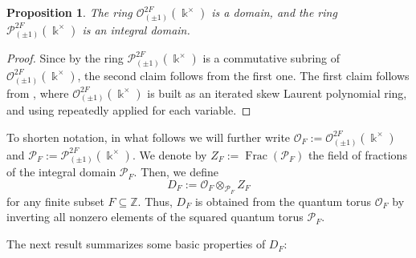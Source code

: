 \documentclass{amsart}
\newtheorem{prop}[equation]{Proposition}
\theoremstyle{definition}
\newcommand{\opn}{\operatorname}
\renewcommand{\k}{\Bbbk}
\numberwithin{equation}{section}
\begin{document}
\begin{prop}\label{prop:is-domain}
The ring $\mathcal{O}^{2F}_{(\pm 1)}(\k^{\times})$ is a domain,
and the ring $\mathcal{P}^{2F}_{(\pm 1)}(\k^{\times})$ is an integral domain.
\end{prop}
\begin{proof}
Since by  the ring $\mathcal{P}^{2F}_{(\pm 1)}(\k^{\times})$ is a commutative subring of $\mathcal{O}^{2F}_{(\pm 1)}(\k^{\times})$,
the second claim follows from the first one.
The first claim follows from \cite[Example 1.5.10(ii)]{NCBook}, 
where $\mathcal{O}^{2F}_{(\pm 1)}(\k^{\times})$ is built as an iterated  skew Laurent polynomial ring, and using \cite[Theorem 1.2.9(i), Theorem 1.4.5]{NCBook} repeatedly applied for each variable.
\end{proof}

To shorten notation, in what follows we will further write
$\mathcal{O}_F := \mathcal{O}^{2F}_{(\pm 1)}(\k^{\times})$
and $\mathcal{P}_F := \mathcal{P}^{2F}_{(\pm 1)}(\k^{\times})$.
We denote by $Z_F := \opn{Frac}(\mathcal{P}_F)$ the field of fractions of the integral domain $\mathcal{P}_F$.
Then, we define
\begin{equation}
D_F := \mathcal{O}_F \otimes_{\mathcal{P}_F} Z_F
\end{equation}
for any finite subset $F \subseteq \mathbb{Z}$.
Thus, $D_F$ is obtained from the quantum torus $\mathcal{O}_F$ by inverting all nonzero elements of the squared quantum torus $\mathcal{P}_F$.

The next result summarizes some basic properties of $D_F$:
\end{document}
